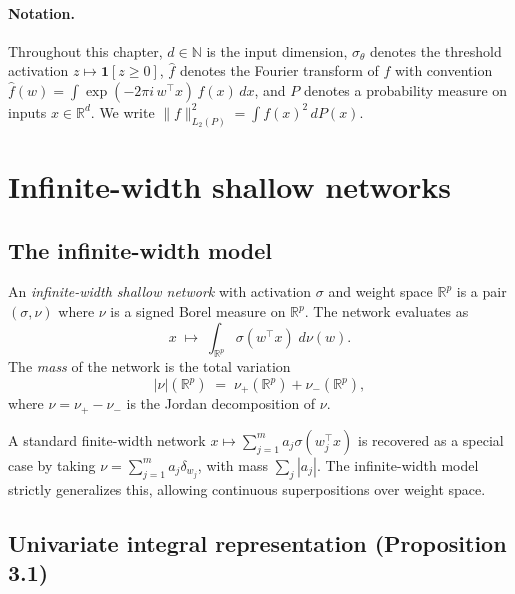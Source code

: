 \paragraph{Notation.}
Throughout this chapter, $d \in \mathbb{N}$ is the input dimension,
$\sigma_\theta$ denotes the threshold activation $z \mapsto \mathbf{1}[z \ge 0]$,
$\widehat{f}$ denotes the Fourier transform of $f$ with convention
$\widehat{f}(w) = \int \exp(-2\pi i\, w^\top x)\, f(x)\, dx$,
and $P$ denotes a probability measure on inputs $x \in \mathbb{R}^d$.
We write $\|f\|_{L_2(P)}^2 = \int f(x)^2\, dP(x)$.

\section{Infinite-width shallow networks}
\label{sec:infinite-width}

\subsection{The infinite-width model}

\begin{definition}\label{def:infiniteWidthNetwork}
An \emph{infinite-width shallow network} with activation $\sigma$ and weight space
$\mathbb{R}^p$ is a pair $(\sigma, \nu)$ where $\nu$ is a signed Borel measure on
$\mathbb{R}^p$.
The network evaluates as
\[
  x \;\mapsto\; \int_{\mathbb{R}^p} \sigma(w^\top x)\; d\nu(w).
\]
The \emph{mass} of the network is the total variation
\[
  |\nu|(\mathbb{R}^p) \;=\; \nu_+(\mathbb{R}^p) + \nu_-(\mathbb{R}^p),
\]
where $\nu = \nu_+ - \nu_-$ is the Jordan decomposition of $\nu$.
\end{definition}

\begin{remark}
  A standard finite-width network $x \mapsto \sum_{j=1}^m a_j \sigma(w_j^\top x)$ is
  recovered as a special case by taking $\nu = \sum_{j=1}^m a_j \delta_{w_j}$, with
  mass $\sum_j |a_j|$.  The infinite-width model strictly generalizes this, allowing
  continuous superpositions over weight space.
\end{remark}

\subsection{Univariate integral representation (Proposition 3.1)}


